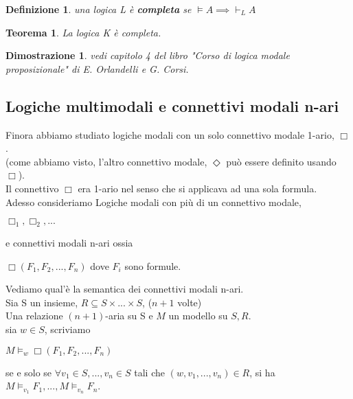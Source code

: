 \documentclass[a4paper,12pt]{article}
\theoremstyle{def}
\newtheorem*{definition}{Definizione}
\theoremstyle{prop}
\theoremstyle{esempio}
\theoremstyle{dimostrazione}
\newtheorem*{dimostrazione}{Dimostrazione}
\theoremstyle{teo}
\newtheorem*{teorema}{Teorema}
\theoremstyle{osservazione}
\begin{document}
\begin{definition}
	una logica L è \textbf{completa} se \(\vDash A \implies \vdash_L A\)
\end{definition}
\begin{teorema}
	La logica K è completa.
\end{teorema}
\begin{dimostrazione}
	vedi capitolo 4 del libro \textit{"Corso di logica modale proposizionale"} di E. Orlandelli e G. Corsi.
\end{dimostrazione}
\newpage
\subsection{Logiche multimodali e connettivi modali n-ari}
Finora abbiamo studiato logiche modali con un solo connettivo modale 1-ario, \(\Box\).\\
(come abbiamo visto, l'altro connettivo modale, \(\Diamond\) può essere definito usando \(\Box\)).\\
Il connettivo \(\Box\) era 1-ario nel senso che si applicava ad una sola formula.\\
Adesso consideriamo Logiche modali con più di un connettivo modale,
\begin{center}
	\(\Box_1, \Box_2, ...\)\\
\end{center}
e connettivi modali n-ari ossia
\begin{center}
	\(\Box (F_1, F_2, ..., F_n)\) dove \(F_i\) sono formule.\\
\end{center}
Vediamo qual'è la semantica dei connettivi modali n-ari.\\
Sia S un insieme, \(R \subseteq S \times ... \times S\), (\(n + 1\) volte)\\
Una relazione \((n + 1)\)-aria su S e \(M\) un modello su \(S,R\).\\
sia \(w \in S\), scriviamo
\begin{center}
	\(M \vDash_w \Box (F_1, F_2, ..., F_n)\)
\end{center}
se e solo se \(\forall v_1 \in S, ... , v_n \in S\) tali che \((w,v_1,...,v_n) \in R\), si ha \(M \vDash_{v_1} F_1, ... , M \vDash_{v_n} F_n\).\\
\end{document}
